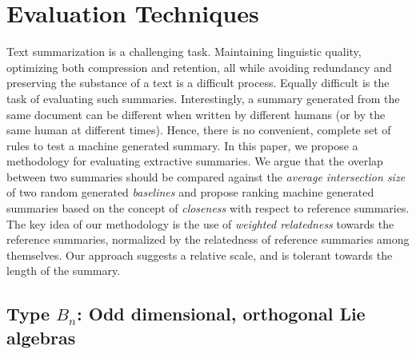 \chapter{Evaluation Techniques}

Text summarization is a challenging task.  Maintaining linguistic quality, optimizing both compression and retention, all while avoiding redundancy and preserving the substance of a text is a difficult process.  Equally difficult is the task of evaluating such summaries.  Interestingly, a summary generated from the same document can be different when written by different humans (or by the same human at different times).  Hence, there is no convenient, complete set of rules to test a machine generated summary. In this paper, we propose a methodology for evaluating extractive summaries.  We argue that the overlap between two summaries should be compared against the \emph{average intersection size} of two random generated \emph{baselines} and propose ranking machine generated summaries based on the concept of \emph{closeness} with respect to reference summaries. The key idea of our methodology is the use of \emph{weighted relatedness} towards the reference summaries, normalized by the relatedness of reference summaries among themselves. Our approach suggests a relative scale, and is tolerant towards the length of the summary. 



\section{Type \texorpdfstring{$B_n$}{Bn}: Odd dimensional, orthogonal Lie
  algebras} 

